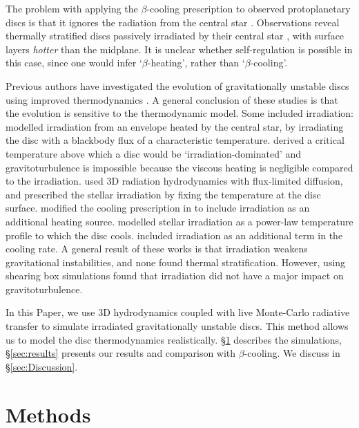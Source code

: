 \documentclass[usenatbib]{mnras}
\begin{document}
The problem with applying the $\beta$-cooling prescription to observed protoplanetary discs is that it ignores the radiation from the central star \citep{2016Kratter}.
Observations reveal thermally stratified discs passively irradiated by their central star \citep{1987Adams,1987Kenyon,Pinte2018,2021Law}, with surface layers \emph{hotter} than the midplane. It is unclear whether self-regulation is possible in this case, since one would infer `$\beta$-heating', rather than `$\beta$-cooling'.

Previous authors have investigated the evolution of gravitationally unstable discs using improved thermodynamics \citep{2002Boss,2004Mejia,2007Boley,2007Stamatellos,2009aForgan,2023SteimanCameron}. A general conclusion of these studies is that the evolution is sensitive to the thermodynamic model. Some included irradiation: \cite{2008Cai} modelled irradiation from an envelope heated by the central star, by irradiating the disc with a blackbody flux of a characteristic temperature.  \citet{2011Kratter} derived a critical temperature above which a disc would be `irradiation-dominated' and gravitoturbulence is impossible because the viscous heating is negligible compared to the irradiation. \citet{2010Meru} used 3D radiation hydrodynamics with flux-limited diffusion, and prescribed the stellar irradiation by fixing the temperature at the disc surface. \cite{2011Rice} modified the cooling prescription in \cite{2001Gammie} to include irradiation as an additional heating source. \cite{2013aForgan,2020Haworth,2020aCadman} modelled stellar irradiation as a power-law temperature profile to which the disc cools. \cite{2016Hall} included irradiation as an additional term in the cooling rate. A general result of these works is that irradiation weakens gravitational instabilities, and none found thermal stratification. However, using shearing box simulations \cite{2017Hirose} found that irradiation did not have a major impact on gravitoturbulence.

In this Paper, we use 3D hydrodynamics coupled with live Monte-Carlo radiative transfer to simulate irradiated gravitationally unstable discs. This method allows us to model the disc thermodynamics realistically.  \S\ref{sec:model} describes the simulations, \S\ref{sec:results} presents our results and comparison with $\beta$-cooling. We discuss in \S\ref{sec:Discussion}.

\section{Methods}
\label{sec:model}
\end{document}
